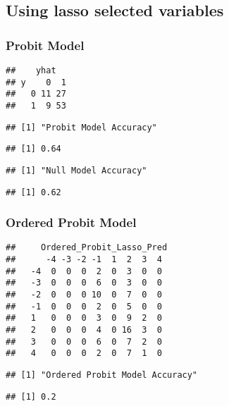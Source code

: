 \documentclass[
]{article}
\begin{document}
\hypertarget{using-lasso-selected-variables}{%
\subsection{Using lasso selected
variables}\label{using-lasso-selected-variables}}

\hypertarget{probit-model}{%
\subsubsection{Probit Model}\label{probit-model}}

\begin{verbatim}
##    yhat
## y    0  1
##   0 11 27
##   1  9 53
\end{verbatim}

\begin{verbatim}
## [1] "Probit Model Accuracy"
\end{verbatim}

\begin{verbatim}
## [1] 0.64
\end{verbatim}

\begin{verbatim}
## [1] "Null Model Accuracy"
\end{verbatim}

\begin{verbatim}
## [1] 0.62
\end{verbatim}

\hypertarget{ordered-probit-model}{%
\subsubsection{Ordered Probit Model}\label{ordered-probit-model}}

\begin{verbatim}
##     Ordered_Probit_Lasso_Pred
##      -4 -3 -2 -1  1  2  3  4
##   -4  0  0  0  2  0  3  0  0
##   -3  0  0  0  6  0  3  0  0
##   -2  0  0  0 10  0  7  0  0
##   -1  0  0  0  2  0  5  0  0
##   1   0  0  0  3  0  9  2  0
##   2   0  0  0  4  0 16  3  0
##   3   0  0  0  6  0  7  2  0
##   4   0  0  0  2  0  7  1  0
\end{verbatim}

\begin{verbatim}
## [1] "Ordered Probit Model Accuracy"
\end{verbatim}

\begin{verbatim}
## [1] 0.2
\end{verbatim}
\end{document}
